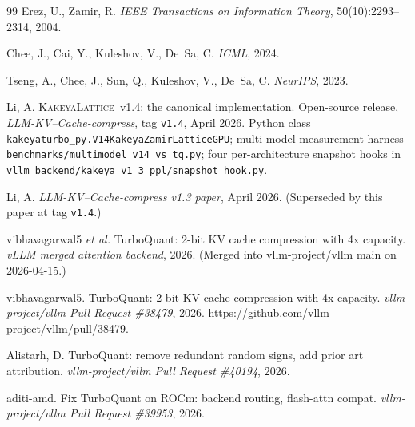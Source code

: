 \documentclass[11pt,a4paper]{article}
\theoremstyle{definition}
\theoremstyle{plain}
\begin{document}
\begin{thebibliography}{99}
Erez, U., Zamir, R.
\newblock \emph{IEEE Transactions on Information Theory}, 50(10):2293--2314, 2004.

Chee, J., Cai, Y., Kuleshov, V., De~Sa, C.
\newblock \emph{ICML}, 2024.

Tseng, A., Chee, J., Sun, Q., Kuleshov, V., De~Sa, C.
\newblock \emph{NeurIPS}, 2023.


Li, A.
\newblock \textsc{KakeyaLattice}~v1.4: the canonical implementation.
\newblock Open-source release, \emph{LLM-KV--Cache-compress}, tag \texttt{v1.4}, April 2026.
\newblock Python class \texttt{kakeyaturbo\_py.V14KakeyaZamirLatticeGPU}; multi-model
  measurement harness \texttt{benchmarks/multimodel\_v14\_vs\_tq.py}; four
  per-architecture snapshot hooks in
  \texttt{vllm\_backend/kakeya\_v1\_3\_ppl/snapshot\_hook.py}.

Li, A.
\newblock \emph{LLM-KV--Cache-compress v1.3 paper}, April 2026.
\newblock (Superseded by this paper at tag \texttt{v1.4}.)

vibhavagarwal5 \emph{et al.}
\newblock TurboQuant: 2-bit KV cache compression with 4x capacity.
\newblock \emph{vLLM merged attention backend}, 2026.
\newblock (Merged into vllm-project/vllm main on 2026-04-15.)

vibhavagarwal5.
 TurboQuant: 2-bit KV cache compression with 4x capacity.
\newblock \emph{vllm-project/vllm Pull Request \#38479}, 2026.
\newblock \url{https://github.com/vllm-project/vllm/pull/38479}.

Alistarh, D.
\newblock [Attention] TurboQuant: remove redundant random signs, add prior art attribution.
\newblock \emph{vllm-project/vllm Pull Request \#40194}, 2026.

aditi-amd.
\newblock [ROCm] Fix TurboQuant on ROCm: backend routing, flash-attn compat.
\newblock \emph{vllm-project/vllm Pull Request \#39953}, 2026.


\end{thebibliography}
\end{document}
